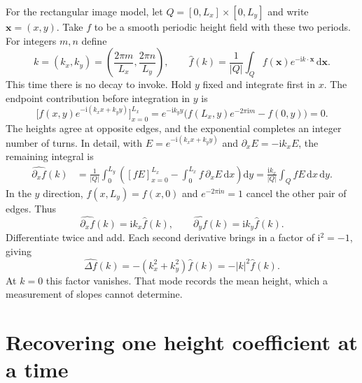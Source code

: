 \documentclass[11pt,a4paper]{article}
\numberwithin{equation}{section}
\newcommand{\ii}{\mathrm{i}}
\newcommand{\dd}{\mathrm{d}}
\begin{document}
For the rectangular image model, let $Q=[0,L_x]\times[0,L_y]$ and write
$\boldsymbol{x}=(x,y)$. Take $f$ to be a smooth periodic height field with these
two periods. For integers $m,n$ define
\begin{equation}
  k=(k_x,k_y)=\left(\frac{2\pi m}{L_x},\frac{2\pi n}{L_y}\right),
  \qquad
  \widehat f(k)=\frac{1}{|Q|}\int_Q
        f(\boldsymbol{x})e^{-\mathrm ik\cdot\boldsymbol{x}}\,\mathrm d\boldsymbol{x} .
\end{equation}
This time there is no decay to invoke. Hold $y$ fixed and integrate first in
$x$. The endpoint contribution before integration in $y$ is
\begin{equation}
  \bigl[f(x,y)e^{-\mathrm i(k_xx+k_yy)}\bigr]_{x=0}^{L_x}
  =e^{-\mathrm i k_y y}\bigl(f(L_x,y)e^{-2\pi\mathrm i m}-f(0,y)\bigr)=0 .
\end{equation}
The heights agree at opposite edges, and the exponential completes an integer
number of turns. In detail, with $E=e^{-\ii(k_xx+k_yy)}$ and
$\partial_x E=-\ii k_x E$, the remaining integral is
\begin{align}
 \widehat{\partial_x f}(k)
 &=\frac{1}{|Q|}\int_0^{L_y}
    \left([fE]_{x=0}^{L_x}-\int_0^{L_x}f\,\partial_x E\,\dd x\right)\dd y
   =\frac{\ii k_x}{|Q|}\int_Q fE\,\dd x\,\dd y .
\end{align}
In the $y$ direction, $f(x,L_y)=f(x,0)$ and
$e^{-2\pi\mathrm i n}=1$ cancel the other pair of edges. Thus
\begin{equation}\label{eq:multiplier}
  \widehat{\partial_x f}(k)=\mathrm i k_x\widehat f(k),
  \qquad
  \widehat{\partial_y f}(k)=\mathrm i k_y\widehat f(k).
\end{equation}
Differentiate twice and add. Each second derivative brings in a factor of
$\mathrm i^2=-1$, giving
\begin{equation}\label{eq:lapmult}
  \widehat{\Delta f}(k)
  =-(k_x^2+k_y^2)\widehat f(k)
  =-|k|^2\widehat f(k).
\end{equation}
At $k=0$ this factor vanishes. That mode records the mean height,
which a measurement of slopes cannot determine.

\newpage
\section{Recovering one height coefficient at a time}
\end{document}
